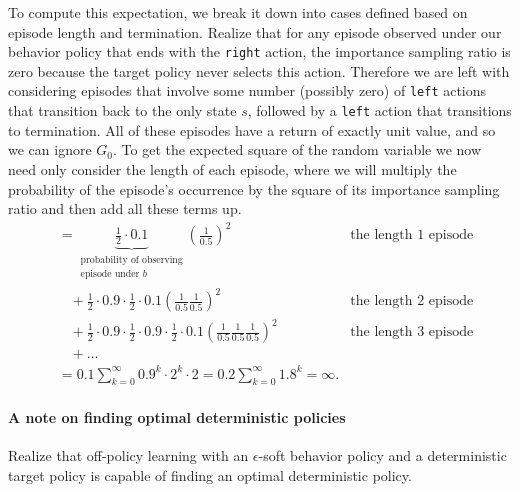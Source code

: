 \documentclass[12pt]{article}
\begin{document}
To compute this expectation, we break it down into cases defined based on episode length and termination. Realize that for any episode observed under our behavior policy that ends with the \texttt{right} action, the importance sampling ratio is zero because the target policy never selects this action. Therefore we are left with considering episodes that involve some number (possibly zero) of \texttt{left} actions that transition back to the only state $s$, followed by a \texttt{left} action that transitions to termination. All of these episodes have a return of exactly unit value, and so we can ignore $G_0$. To get the expected square of the random variable we now need only consider the length of each episode, where we will multiply the probability of the episode's occurrence by the square of its importance sampling ratio and then add all these terms up.
\begin{align*}
  &= \underbrace{\frac{1}{2} \cdot 0.1}_{\substack{\textrm{probability of observing} \\ \textrm{episode under } b}} \left(\frac{1}{0.5}\right)^2 &                                                                          \textrm{the length 1 episode} \\
  & \hspace{10pt} + \frac{1}{2} \cdot 0.9 \cdot \frac{1}{2} \cdot 0.1     \left(\frac{1}{0.5}\frac{1}{0.5}\right)^2 &\textrm{the length 2 episode} \\
  & \hspace{10pt} + \frac{1}{2} \cdot 0.9 \cdot \frac{1}{2} \cdot 0.9 \cdot \frac{1}{2} \cdot 0.1 \left(\frac{1}{0.5}\frac{1}{0.5}\frac{1}{0.5}\right)^2                                                                        &\textrm{the length 3 episode} \\
  & \hspace{10pt} + \ldots \\
  &= 0.1 \sum_{k=0}^{\infty} 0.9^k \cdot 2^{k} \cdot 2 = 0.2 \sum_{k=0}^{\infty} 1.8^k = \infty. 
\end{align*}

\paragraph{A note on finding optimal deterministic policies} Realize that off-policy learning with an $\epsilon$-soft behavior policy and a deterministic target policy is capable of finding an optimal deterministic policy.
\end{document}
